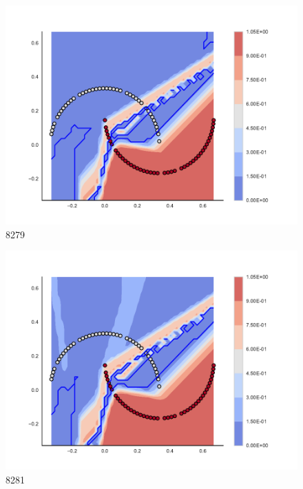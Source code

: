 \begin{subfigure}[b]{0.09\textwidth}
    \includegraphics[clip, trim=2.35cm 1.75cm 4.5cm 0cm,width=\textwidth]{img/convergence/8279.pdf}
    \caption{8279}
    \label{fig:convergence_8279}
\end{subfigure}
%
\begin{subfigure}[b]{0.09\textwidth}
    \includegraphics[clip, trim=2.35cm 1.75cm 4.5cm 0cm,width=\textwidth]{img/convergence/8281.pdf}
    \caption{8281}
    \label{fig:convergence_8281}
\end{subfigure}
%
